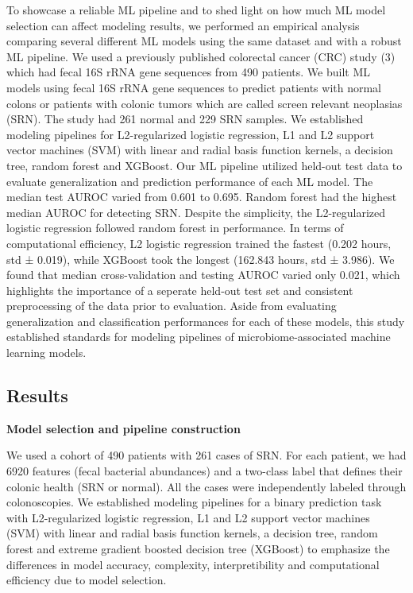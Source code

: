 \documentclass[11pt,]{article}
\begin{document}
To showcase a reliable ML pipeline and to shed light on how much ML
model selection can affect modeling results, we performed an empirical
analysis comparing several different ML models using the same dataset
and with a robust ML pipeline. We used a previously published colorectal
cancer (CRC) study (3) which had fecal 16S rRNA gene sequences from 490
patients. We built ML models using fecal 16S rRNA gene sequences to
predict patients with normal colons or patients with colonic tumors
which are called screen relevant neoplasias (SRN). The study had 261
normal and 229 SRN samples. We established modeling pipelines for
L2-regularized logistic regression, L1 and L2 support vector machines
(SVM) with linear and radial basis function kernels, a decision tree,
random forest and XGBoost. Our ML pipeline utilized held-out test data
to evaluate generalization and prediction performance of each ML model.
The median test AUROC varied from 0.601 to 0.695. Random forest had the
highest median AUROC for detecting SRN. Despite the simplicity, the
L2-regularized logistic regression followed random forest in
performance. In terms of computational efficiency, L2 logistic
regression trained the fastest (0.202 hours, std ± 0.019), while XGBoost
took the longest (162.843 hours, std ± 3.986). We found that median
cross-validation and testing AUROC varied only 0.021, which highlights
the importance of a seperate held-out test set and consistent
preprocessing of the data prior to evaluation. Aside from evaluating
generalization and classification performances for each of these models,
this study established standards for modeling pipelines of
microbiome-associated machine learning models.

\subsection{Results}\label{results}

\textbf{Model selection and pipeline construction}

We used a cohort of 490 patients with 261 cases of SRN. For each
patient, we had 6920 features (fecal bacterial abundances) and a
two-class label that defines their colonic health (SRN or normal). All
the cases were independently labeled through colonoscopies. We
established modeling pipelines for a binary prediction task with
L2-regularized logistic regression, L1 and L2 support vector machines
(SVM) with linear and radial basis function kernels, a decision tree,
random forest and extreme gradient boosted decision tree (XGBoost) to
emphasize the differences in model accuracy, complexity,
interpretibility and computational efficiency due to model selection.
\end{document}
